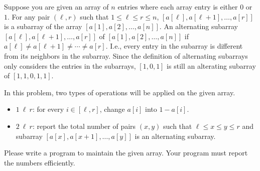 Suppose you are given an array of $n$ entries
where each array entry is either $0$ or $1$.
For any pair $(\ell,r)$ such that $1\le \ell \le r\le n$, 
$[a[\ell],a[\ell+1],\dots,a[r]]$ is a subarray of the array
$[a[1], a[2], \dots, a[n]]$.
An alternating subarray $[a[\ell],a[\ell+1],\dots,a[r]]$ of 
$[a[1], a[2], \dots, a[n]]$
if $a[\ell]\neq a[\ell+1]\neq \cdots \neq a[r]$. I.e., every entry
in the subarray is different from its neighbors in the subarray.
Since the definition of alternating subarrays only considers the entries in
the subarrays, $[1,0,1]$ is still an alterating subarray of $[1,1,0,1,1]$.

In this problem, two types of operations will be applied on the given array.
\begin{itemize}
\item $1~\ell~r$: for every $i\in[\ell,r]$, change $a[i]$ into $1-a[i]$.
\item $2~\ell~r$: report the total number of pairs $(x, y)$ such that 
$\ell \leq x \leq y \leq r$ and subarray 
$[a[x],a[x+1],\dots,a[y]]$ is an alternating subarray.
\end{itemize}

Please write a program to maintain the given array.
Your program must report the numbers efficiently.
